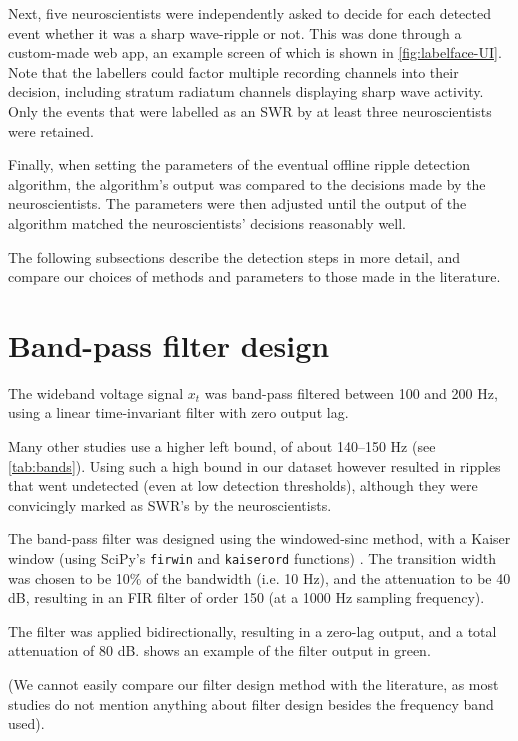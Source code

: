 Next, five neuroscientists were independently asked to decide for each detected event whether it was a sharp wave-ripple or not. This was done through a custom-made web app, an example screen of which is shown in \cref{fig:labelface-UI}. Note that the labellers could factor multiple recording channels into their decision, including stratum radiatum channels displaying sharp wave activity. Only the events that were labelled as an SWR by at least three neuroscientists were retained.

Finally, when setting the parameters of the eventual offline ripple detection algorithm, the algorithm's output was compared to the decisions made by the neuroscientists. The parameters were then adjusted until the output of the algorithm matched the neuroscientists' decisions reasonably well.

The following subsections describe the detection steps in more detail, and compare our choices of methods and parameters to those made in the literature.


\section{Band-pass filter design}

The wideband voltage signal $x_t$ was band-pass filtered between 100 and 200 Hz, using a linear time-invariant filter with zero output lag.

Many other studies use a higher left bound, of about 140--150 Hz (see \cref{tab:bands}). Using such a high bound in our dataset however resulted in ripples that went undetected (even at low detection thresholds), although they were convicingly marked as SWR's by the neuroscientists.

The band-pass filter was designed using the windowed-sinc method, with a Kaiser window (using SciPy's \texttt{firwin} and \texttt{kaiserord} functions) \cite{Roelandts2016,Jones2018a}. The transition width was chosen to be 10\% of the bandwidth (i.e. 10 Hz), and the attenuation to be 40 dB, resulting in an FIR filter of order 150 (at a 1000 Hz sampling frequency).

The filter was applied bidirectionally, resulting in a zero-lag output, and a total attenuation of 80 dB.  shows an example of the filter output in green.

(We cannot easily compare our filter design method with the literature, as most studies do not mention anything about filter design besides the frequency band used).



